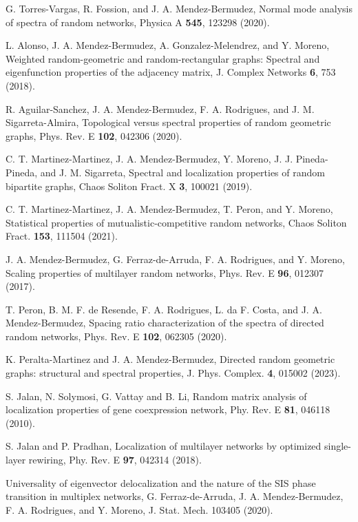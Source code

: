 \begin{thebibliography}{00}
G. Torres-Vargas, R. Fossion, and J. A. Mendez-Bermudez,
Normal mode analysis of spectra of random networks,
Physica A {\bf 545}, 123298 (2020).

L. Alonso, J. A. Mendez-Bermudez, A. Gonzalez-Melendrez, and Y. Moreno,
Weighted random-geometric and random-rectangular graphs: Spectral and eigenfunction properties of the adjacency matrix,            
J. Complex Networks {\bf 6}, 753 (2018).

R. Aguilar-Sanchez, J. A. Mendez-Bermudez, F. A. Rodrigues, and J. M. Sigarreta-Almira,
Topological versus spectral properties of random geometric graphs,
Phys. Rev. E {\bf 102}, 042306 (2020).

C. T. Martinez-Martinez, J. A. Mendez-Bermudez, Y. Moreno, J. J. Pineda-Pineda, and J. M. Sigarreta,
Spectral and localization properties of random bipartite graphs,
Chaos Soliton Fract. X {\bf 3}, 100021 (2019).

C. T. Martinez-Martinez, J. A. Mendez-Bermudez, T. Peron, and Y. Moreno,
Statistical properties of mutualistic-competitive random networks,
Chaos Soliton Fract. {\bf 153}, 111504 (2021).

J. A. Mendez-Bermudez, G. Ferraz-de-Arruda, F. A. Rodrigues, and Y. Moreno,
Scaling properties of multilayer random networks,
Phys. Rev. E {\bf 96}, 012307 (2017).

T. Peron, B. M. F. de Resende, F. A. Rodrigues, L. da F. Costa, and J. A. Mendez-Bermudez,
Spacing ratio characterization of the spectra of directed random networks,
Phys. Rev. E {\bf 102}, 062305 (2020).

K. Peralta-Martinez and J. A. Mendez-Bermudez,
Directed random geometric graphs: structural and spectral properties,
J. Phys. Complex. {\bf 4}, 015002 (2023).

S. Jalan, N. Solymosi, G. Vattay and B. Li,
Random matrix analysis of localization properties of gene coexpression network,
Phy. Rev. E {\bf 81}, 046118 (2010).

S. Jalan and P. Pradhan,
Localization of multilayer networks by optimized single-layer rewiring,
Phy. Rev. E {\bf 97}, 042314 (2018).

Universality of eigenvector delocalization and the nature of the SIS phase transition in multiplex networks,
G. Ferraz-de-Arruda, J. A. Mendez-Bermudez, F. A. Rodrigues, and Y. Moreno,
J. Stat. Mech. 103405 (2020).


\end{thebibliography}
